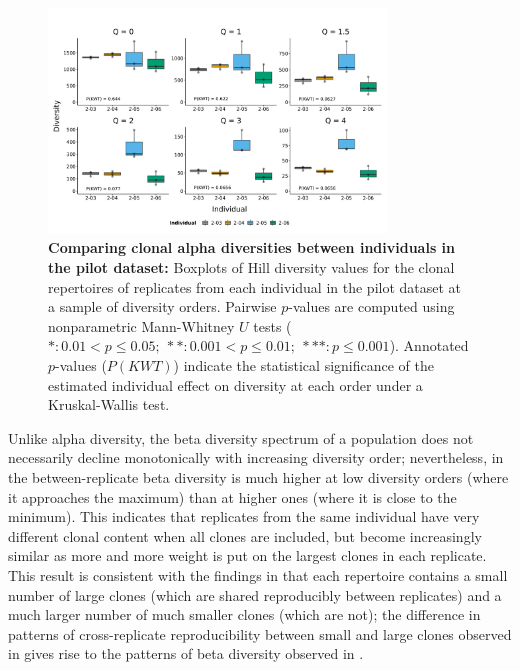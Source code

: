 \begin{figure}
\centering
\includegraphics[width = 0.8\textwidth]{_Figures/png/pilot-clone-diversity-solo-box}
\caption[Comparing clonal alpha diversities between individuals in the \igseq pilot dataset]{\textbf{Comparing clonal alpha diversities between individuals in the \igseq pilot dataset:} Boxplots of Hill diversity values for the clonal repertoires of replicates from each individual in the \igseq pilot dataset at a sample of diversity orders. Pairwise $p$-values are computed using nonparametric Mann-Whitney $U$ tests ($*: 0.01 < p \leq 0.05;~**: 0.001 < p \leq 0.01;~***: p \leq 0.001$). Annotated $p$-values ($P(KWT)$) indicate the statistical significance of the estimated individual effect on diversity at each order under a Kruskal-Wallis test.}
\label{fig:igseq-pilot-clone-diversity-solo-box}
\end{figure}

Unlike alpha diversity, the beta diversity spectrum of a population does not necessarily decline monotonically with increasing diversity order; nevertheless, in  the between-replicate beta diversity is much higher at low diversity orders (where it approaches the maximum) than at higher ones (where it is close to the minimum). This indicates that replicates from the same individual have very different clonal content when all clones are included, but become increasingly similar as more and more weight is put on the largest clones in each replicate. This result is consistent with the findings in  that each repertoire contains a small number of large clones (which are shared reproducibly between replicates) and a much larger number of much smaller clones (which are not); the difference in patterns of cross-replicate reproducibility between small and large clones observed in  gives rise to the patterns of beta diversity observed in .

